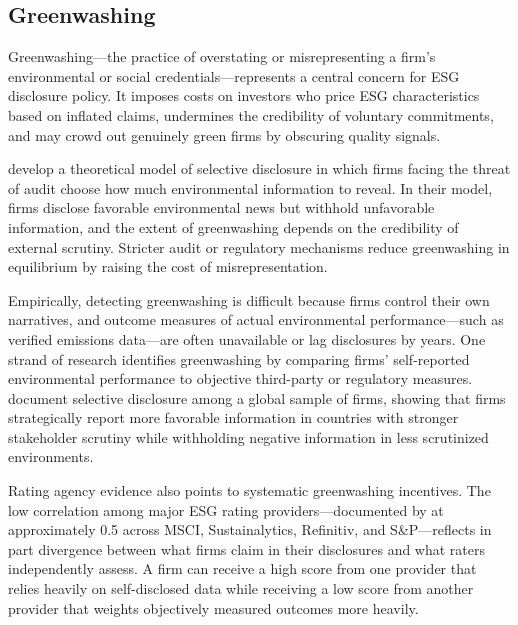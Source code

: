 \subsection{Greenwashing}
\label{subsec:greenwashing}

Greenwashing---the practice of overstating or misrepresenting a firm's
environmental or social credentials---represents a central concern for ESG
disclosure policy. It imposes costs on investors who price ESG characteristics
based on inflated claims, undermines the credibility of voluntary commitments,
and may crowd out genuinely green firms by obscuring quality signals.

\textcite{Lyon2011_greenwash} develop a theoretical model of selective
disclosure in which firms facing the threat of audit choose how much
environmental information to reveal. In their model, firms disclose favorable
environmental news but withhold unfavorable information, and the extent of
greenwashing depends on the credibility of external scrutiny. Stricter audit or
regulatory mechanisms reduce greenwashing in equilibrium by raising the cost of
misrepresentation.

Empirically, detecting greenwashing is difficult because firms control their own
narratives, and outcome measures of actual environmental performance---such as
verified emissions data---are often unavailable or lag disclosures by years.
One strand of research identifies greenwashing by comparing firms' self-reported
environmental performance to objective third-party or regulatory measures.
\textcite{Marquis2016_selective} document selective disclosure among a global
sample of firms, showing that firms strategically report more favorable
information in countries with stronger stakeholder scrutiny while withholding
negative information in less scrutinized environments.

Rating agency evidence also points to systematic greenwashing incentives. The
low correlation among major ESG rating providers---documented by
\textcite{Berg2022_disagreement} at approximately 0.5 across MSCI,
Sustainalytics, Refinitiv, and S\&P---reflects in part divergence between what
firms claim in their disclosures and what raters independently assess. A firm
can receive a high score from one provider that relies heavily on
self-disclosed data while receiving a low score from another provider that
weights objectively measured outcomes more heavily.

